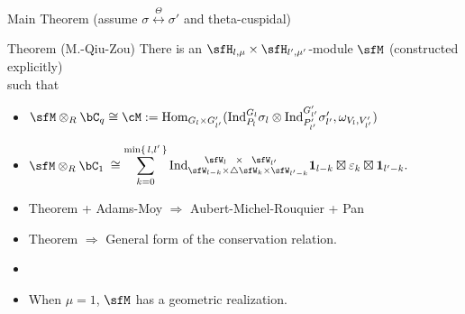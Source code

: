 \documentclass[t,mathserif,11pt,usenames,dvipsnames]{beamer}
\theoremstyle{plain}
\theoremstyle{definition}
\newcommand{\bfone}{\mathbf{1}}
\def\Hom{{\rm Hom}}
\def\Ind{{\rm Ind}}
\def\Hom{{\mathrm{Hom}}}
\begin{document}
\begin{frame}{Main Theorem (assume $\sigma\stackrel{\Theta}{\longleftrightarrow}\sigma'$ and theta-cuspidal)}

  \begin{block}{Theorem (M.-Qiu-Zou)}
    There is an $\sfH_{l,\mu}\times \sfH_{l',\mu'}$-module $\sfM$ (constructed explicitly)\\
    such that
    \begin{itemize}
      \item
            $\sfM \otimes_{R}\bC_{q} \cong \cM:=\Hom_{G_l\times G'_{l'}}(\Ind_{P_{l}}^{G_{l}}\sigma_l\otimes \Ind_{P'_{l'}}^{G'_{l'}}\sigma'_{l'}, \omega_{V_l,V'_{l'}})$ %
      \item $\sfM\otimes_{R}\bC_{1}$
            $ \cong \displaystyle\sum_{k=0}^{\min\set{l,l'}} \Ind_{\sfW_{l-k}\times \triangle \sfW_{k}\times \sfW_{l'-k}}^{\ \ \ \ \sfW_{l}\ \ \times\ \ \sfW_{l'}} \bfone_{l-k} \boxtimes \varepsilon_{k}\boxtimes\bfone_{l'-k}. $
    \end{itemize}
  \end{block}
  \begin{itemize}
    \item Theorem + Adams-Moy $\Rightarrow$ Aubert-Michel-Rouquier + Pan \pause
    \item Theorem  $\Rightarrow$ General form of the conservation relation. \pause
    \item[]
    \item When $\mu=1$, $\sfM$ has a geometric realization.
  \end{itemize}
\end{frame}
\end{document}
